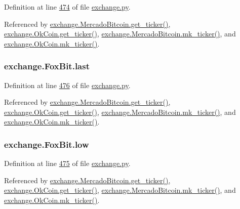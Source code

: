 Definition at line \hyperlink{exchange_8py_source_l00474}{474} of file \hyperlink{exchange_8py_source}{exchange.\+py}.



Referenced by \hyperlink{exchange_8py_source_l00543}{exchange.\+Mercado\+Bitcoin.\+get\+\_\+ticker()}, \hyperlink{exchange_8py_source_l00608}{exchange.\+Ok\+Coin.\+get\+\_\+ticker()}, \hyperlink{exchange_8py_source_l00557}{exchange.\+Mercado\+Bitcoin.\+mk\+\_\+ticker()}, and \hyperlink{exchange_8py_source_l00622}{exchange.\+Ok\+Coin.\+mk\+\_\+ticker()}.

\subsubsection[{\texorpdfstring{last}{last}}]{\setlength{\rightskip}{0pt plus 5cm}exchange.\+Fox\+Bit.\+last}\hypertarget{classexchange_1_1_fox_bit_a5cdbc327b005014dc3b8bb6fb54a12fd}{}\label{classexchange_1_1_fox_bit_a5cdbc327b005014dc3b8bb6fb54a12fd}


Definition at line \hyperlink{exchange_8py_source_l00476}{476} of file \hyperlink{exchange_8py_source}{exchange.\+py}.



Referenced by \hyperlink{exchange_8py_source_l00543}{exchange.\+Mercado\+Bitcoin.\+get\+\_\+ticker()}, \hyperlink{exchange_8py_source_l00608}{exchange.\+Ok\+Coin.\+get\+\_\+ticker()}, \hyperlink{exchange_8py_source_l00557}{exchange.\+Mercado\+Bitcoin.\+mk\+\_\+ticker()}, and \hyperlink{exchange_8py_source_l00622}{exchange.\+Ok\+Coin.\+mk\+\_\+ticker()}.

\subsubsection[{\texorpdfstring{low}{low}}]{\setlength{\rightskip}{0pt plus 5cm}exchange.\+Fox\+Bit.\+low}\hypertarget{classexchange_1_1_fox_bit_acd666444cff98fe477651120ddb0f915}{}\label{classexchange_1_1_fox_bit_acd666444cff98fe477651120ddb0f915}


Definition at line \hyperlink{exchange_8py_source_l00475}{475} of file \hyperlink{exchange_8py_source}{exchange.\+py}.



Referenced by \hyperlink{exchange_8py_source_l00543}{exchange.\+Mercado\+Bitcoin.\+get\+\_\+ticker()}, \hyperlink{exchange_8py_source_l00608}{exchange.\+Ok\+Coin.\+get\+\_\+ticker()}, \hyperlink{exchange_8py_source_l00557}{exchange.\+Mercado\+Bitcoin.\+mk\+\_\+ticker()}, and \hyperlink{exchange_8py_source_l00622}{exchange.\+Ok\+Coin.\+mk\+\_\+ticker()}.

